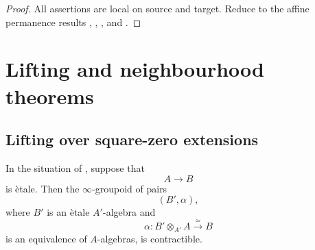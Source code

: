 \begin{proof}
All assertions are local on source and target. Reduce to the affine
permanence results
,
,
, and
.
\end{proof}



\section{Lifting and neighbourhood theorems}
\label{sec:smooth-etale-lifting-neighbourhoods}

\subsection{Lifting over square-zero extensions}

\begin{corollary}
\label{cor:lifting-etale-algebras}
In the situation of , suppose that
\[
    A
    \longrightarrow
    B
\]
is \`etale. Then the \(\infty\)-groupoid of pairs
\[
    (B',\alpha),
\]
where \(B'\) is an \`etale \(A'\)-algebra and
\[
    \alpha
    \colon
    B'\otimes_{A'}A
    \xrightarrow{\simeq}
    B
\]
is an equivalence of \(A\)-algebras, is contractible.
\end{corollary}

